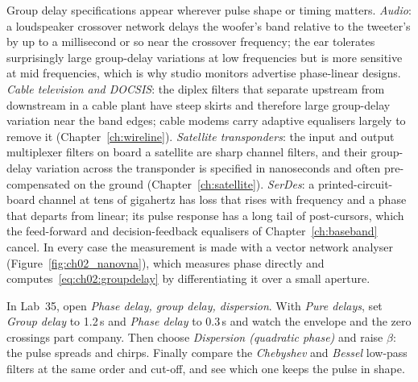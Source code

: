 \begin{inpractice}
Group delay specifications appear wherever pulse shape or timing matters. \emph{Audio}: a
loudspeaker crossover network delays the woofer's band relative to the tweeter's by up to a
millisecond or so near the crossover frequency; the ear tolerates surprisingly large group-delay
variations at low frequencies but is more sensitive at mid frequencies, which is why studio
monitors advertise phase-linear designs. \emph{Cable television and DOCSIS}: the diplex filters
that separate upstream from downstream in a cable plant have steep skirts and therefore large
group-delay variation near the band edges; cable modems carry adaptive equalisers largely to
remove it (Chapter~\ref{ch:wireline}). \emph{Satellite transponders}: the input and output
multiplexer filters on board a satellite are sharp channel filters, and their group-delay
variation across the transponder is specified in nanoseconds and often pre-compensated on the
ground (Chapter~\ref{ch:satellite}). \emph{SerDes}: a printed-circuit-board channel at tens of
gigahertz has loss that rises with frequency and a phase that departs from linear; its
pulse response has a long tail of post-cursors, which the feed-forward and decision-feedback
equalisers of Chapter~\ref{ch:baseband} cancel. In every case the measurement is made with a
vector network analyser (Figure~\ref{fig:ch02_nanovna}), which measures phase directly and
computes~\eqref{eq:ch02:groupdelay} by differentiating it over a small aperture.
\end{inpractice}


\begin{tryit}
In Lab~35, open \emph{Phase delay, group delay, dispersion}. With \emph{Pure delays}, set
\emph{Group delay} to 1.2\,s and \emph{Phase delay} to 0.3\,s and watch the envelope and the zero
crossings part company. Then choose \emph{Dispersion (quadratic phase)} and raise $\beta$: the pulse
spreads and chirps. Finally compare the \emph{Chebyshev} and \emph{Bessel} low-pass filters at the
same order and cut-off, and see which one keeps the pulse in shape.
\end{tryit}

